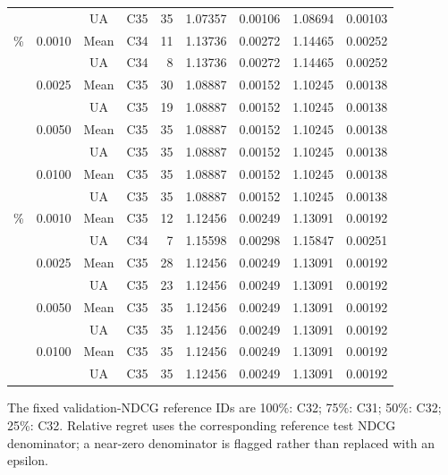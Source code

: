 \begin{table}[H]
{\begin{tabular}{@{}llccrrrrr@{}}
 &  & UA & C35 & 35 & 1.07357 & 0.00106 & 1.08694 & 0.00103 \\
\addlinespace
50\% & 0.0010 & Mean & C34 & 11 & 1.13736 & 0.00272 & 1.14465 & 0.00252 \\
 &  & UA & C34 & 8 & 1.13736 & 0.00272 & 1.14465 & 0.00252 \\
 & 0.0025 & Mean & C35 & 30 & 1.08887 & 0.00152 & 1.10245 & 0.00138 \\
 &  & UA & C35 & 19 & 1.08887 & 0.00152 & 1.10245 & 0.00138 \\
 & 0.0050 & Mean & C35 & 35 & 1.08887 & 0.00152 & 1.10245 & 0.00138 \\
 &  & UA & C35 & 35 & 1.08887 & 0.00152 & 1.10245 & 0.00138 \\
 & 0.0100 & Mean & C35 & 35 & 1.08887 & 0.00152 & 1.10245 & 0.00138 \\
 &  & UA & C35 & 35 & 1.08887 & 0.00152 & 1.10245 & 0.00138 \\
\addlinespace
25\% & 0.0010 & Mean & C35 & 12 & 1.12456 & 0.00249 & 1.13091 & 0.00192 \\
 &  & UA & C34 & 7 & 1.15598 & 0.00298 & 1.15847 & 0.00251 \\
 & 0.0025 & Mean & C35 & 28 & 1.12456 & 0.00249 & 1.13091 & 0.00192 \\
 &  & UA & C35 & 23 & 1.12456 & 0.00249 & 1.13091 & 0.00192 \\
 & 0.0050 & Mean & C35 & 35 & 1.12456 & 0.00249 & 1.13091 & 0.00192 \\
 &  & UA & C35 & 35 & 1.12456 & 0.00249 & 1.13091 & 0.00192 \\
 & 0.0100 & Mean & C35 & 35 & 1.12456 & 0.00249 & 1.13091 & 0.00192 \\
 &  & UA & C35 & 35 & 1.12456 & 0.00249 & 1.13091 & 0.00192 \\
\bottomrule
\end{tabular}%
}
\par\smallskip\footnotesize The fixed validation-NDCG reference IDs are 100\%: C32; 75\%: C31; 50\%: C32; 25\%: C32. Relative regret uses the corresponding reference test NDCG denominator; a near-zero denominator is flagged rather than replaced with an epsilon.
\end{table}
